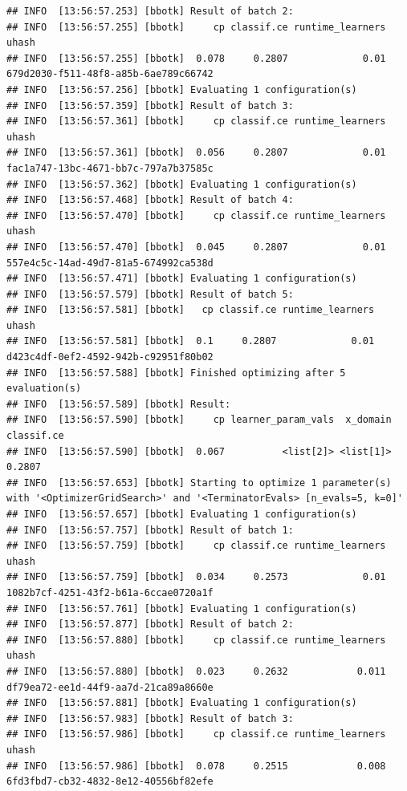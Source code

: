 \documentclass[
]{scrbook}
\begin{document}
\begin{verbatim}
## INFO  [13:56:57.253] [bbotk] Result of batch 2: 
## INFO  [13:56:57.255] [bbotk]     cp classif.ce runtime_learners                                uhash 
## INFO  [13:56:57.255] [bbotk]  0.078     0.2807             0.01 679d2030-f511-48f8-a85b-6ae789c66742 
## INFO  [13:56:57.256] [bbotk] Evaluating 1 configuration(s) 
## INFO  [13:56:57.359] [bbotk] Result of batch 3: 
## INFO  [13:56:57.361] [bbotk]     cp classif.ce runtime_learners                                uhash 
## INFO  [13:56:57.361] [bbotk]  0.056     0.2807             0.01 fac1a747-13bc-4671-bb7c-797a7b37585c 
## INFO  [13:56:57.362] [bbotk] Evaluating 1 configuration(s) 
## INFO  [13:56:57.468] [bbotk] Result of batch 4: 
## INFO  [13:56:57.470] [bbotk]     cp classif.ce runtime_learners                                uhash 
## INFO  [13:56:57.470] [bbotk]  0.045     0.2807             0.01 557e4c5c-14ad-49d7-81a5-674992ca538d 
## INFO  [13:56:57.471] [bbotk] Evaluating 1 configuration(s) 
## INFO  [13:56:57.579] [bbotk] Result of batch 5: 
## INFO  [13:56:57.581] [bbotk]   cp classif.ce runtime_learners                                uhash 
## INFO  [13:56:57.581] [bbotk]  0.1     0.2807             0.01 d423c4df-0ef2-4592-942b-c92951f80b02 
## INFO  [13:56:57.588] [bbotk] Finished optimizing after 5 evaluation(s) 
## INFO  [13:56:57.589] [bbotk] Result: 
## INFO  [13:56:57.590] [bbotk]     cp learner_param_vals  x_domain classif.ce 
## INFO  [13:56:57.590] [bbotk]  0.067          <list[2]> <list[1]>     0.2807 
## INFO  [13:56:57.653] [bbotk] Starting to optimize 1 parameter(s) with '<OptimizerGridSearch>' and '<TerminatorEvals> [n_evals=5, k=0]' 
## INFO  [13:56:57.657] [bbotk] Evaluating 1 configuration(s) 
## INFO  [13:56:57.757] [bbotk] Result of batch 1: 
## INFO  [13:56:57.759] [bbotk]     cp classif.ce runtime_learners                                uhash 
## INFO  [13:56:57.759] [bbotk]  0.034     0.2573             0.01 1082b7cf-4251-43f2-b61a-6ccae0720a1f 
## INFO  [13:56:57.761] [bbotk] Evaluating 1 configuration(s) 
## INFO  [13:56:57.877] [bbotk] Result of batch 2: 
## INFO  [13:56:57.880] [bbotk]     cp classif.ce runtime_learners                                uhash 
## INFO  [13:56:57.880] [bbotk]  0.023     0.2632            0.011 df79ea72-ee1d-44f9-aa7d-21ca89a8660e 
## INFO  [13:56:57.881] [bbotk] Evaluating 1 configuration(s) 
## INFO  [13:56:57.983] [bbotk] Result of batch 3: 
## INFO  [13:56:57.986] [bbotk]     cp classif.ce runtime_learners                                uhash 
## INFO  [13:56:57.986] [bbotk]  0.078     0.2515            0.008 6fd3fbd7-cb32-4832-8e12-40556bf82efe 

\end{verbatim}
\end{document}
